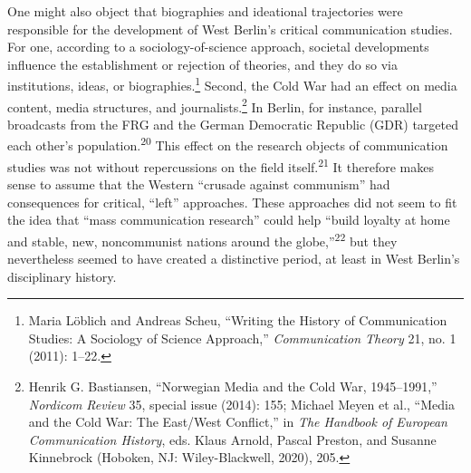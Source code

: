 \documentclass{tufte-handout}
\begin{document}
One might also object that biographies and ideational trajectories were
responsible for the development of West Berlin's critical communication
studies. For one, according to a sociology-of-science approach, societal
developments influence the establishment or rejection of theories, and
they do so via institutions, ideas, or biographies.\footnote{Maria
  Löblich and Andreas Scheu, ``Writing the History of Communication
  Studies: A Sociology of Science Approach,'' \emph{Communication
  Theory} 21, no. 1 (2011): 1--22.} Second, the Cold War had an effect
on media content, media structures, and journalists.\footnote{Henrik G.
  Bastiansen, ``Norwegian Media and the Cold War, 1945--1991,''
  \emph{Nordicom Review} 35, special issue (2014): 155; Michael Meyen et
  al., ``Media and the Cold War: The East/West Conflict,'' in \emph{The
  Handbook of European Communication History}, eds. Klaus Arnold, Pascal
  Preston, and Susanne Kinnebrock (Hoboken, NJ: Wiley-Blackwell, 2020),
  205.} In Berlin, for instance, parallel broadcasts from the FRG and
the German Democratic Republic (GDR) targeted each other's
population.\textsuperscript{20} This effect on the research
objects of communication studies was not without repercussions on the
field itself.\textsuperscript{21} It therefore
makes sense to assume that the Western ``crusade against communism'' had
consequences for critical, ``left'' approaches. These approaches did not
seem to fit the idea that ``mass communication research'' could help
``build loyalty at home and stable, new, noncommunist nations around the
globe,''\textsuperscript{22} but they nevertheless seemed to have created a
distinctive period, at least in West Berlin's disciplinary history.
\end{document}
